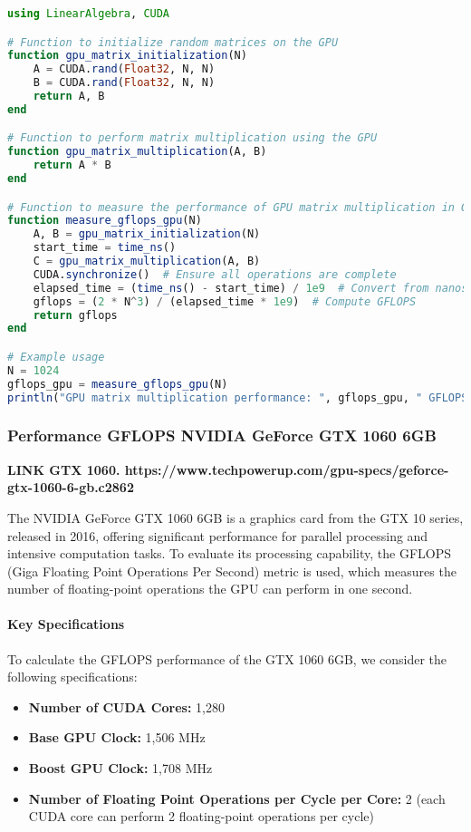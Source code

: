 \begin{lstlisting}[language=Julia]
using LinearAlgebra, CUDA

# Function to initialize random matrices on the GPU
function gpu_matrix_initialization(N)
    A = CUDA.rand(Float32, N, N)
    B = CUDA.rand(Float32, N, N)
    return A, B
end

# Function to perform matrix multiplication using the GPU
function gpu_matrix_multiplication(A, B)
    return A * B
end

# Function to measure the performance of GPU matrix multiplication in GFLOPS
function measure_gflops_gpu(N)
    A, B = gpu_matrix_initialization(N)
    start_time = time_ns()
    C = gpu_matrix_multiplication(A, B)
    CUDA.synchronize()  # Ensure all operations are complete
    elapsed_time = (time_ns() - start_time) / 1e9  # Convert from nanoseconds to seconds
    gflops = (2 * N^3) / (elapsed_time * 1e9)  # Compute GFLOPS
    return gflops
end

# Example usage
N = 1024
gflops_gpu = measure_gflops_gpu(N)
println("GPU matrix multiplication performance: ", gflops_gpu, " GFLOPS")
\end{lstlisting}


\newpage

\subsubsection{Performance GFLOPS NVIDIA GeForce GTX 1060 6GB}

\textbf{LINK GTX 1060. https://www.techpowerup.com/gpu-specs/geforce-gtx-1060-6-gb.c2862}

The NVIDIA GeForce GTX 1060 6GB is a graphics card from the GTX 10 series, released in 2016, offering significant performance for parallel processing and intensive computation tasks. To evaluate its processing capability, the GFLOPS (Giga Floating Point Operations Per Second) metric is used, which measures the number of floating-point operations the GPU can perform in one second.

\paragraph{Key Specifications}

To calculate the GFLOPS performance of the GTX 1060 6GB, we consider the following specifications:

\begin{itemize}
    \item \textbf{Number of CUDA Cores:} 1,280
    \item \textbf{Base GPU Clock:} 1,506 MHz
    \item \textbf{Boost GPU Clock:} 1,708 MHz
    \item \textbf{Number of Floating Point Operations per Cycle per Core:} 2 (each CUDA core can perform 2 floating-point operations per cycle)
\end{itemize}

